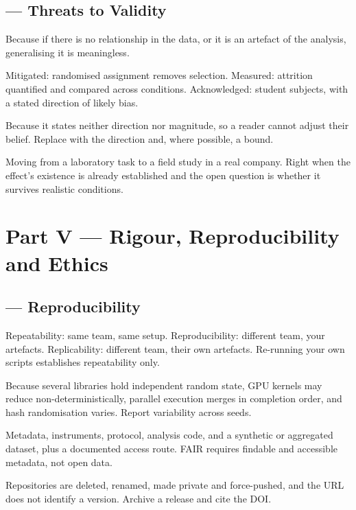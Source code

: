 \subsection*{ --- Threats to Validity}
\begin{tightnum}
  \item Because if there is no relationship in the data, or it is an artefact
    of the analysis, generalising it is meaningless.
  \item Mitigated: randomised assignment removes selection. Measured: attrition
    quantified and compared across conditions. Acknowledged: student subjects,
    with a stated direction of likely bias.
  \item Because it states neither direction nor magnitude, so a reader cannot
    adjust their belief. Replace with the direction and, where possible, a
    bound.
  \item Moving from a laboratory task to a field study in a real company. Right
    when the effect's existence is already established and the open question is
    whether it survives realistic conditions.
\end{tightnum}

\section{Part V --- Rigour, Reproducibility and Ethics}

\subsection*{ --- Reproducibility}
\begin{tightnum}
  \item Repeatability: same team, same setup. Reproducibility: different team,
    your artefacts. Replicability: different team, their own artefacts.
    Re-running your own scripts establishes repeatability only.
  \item Because several libraries hold independent random state, GPU kernels
    may reduce non-deterministically, parallel execution merges in completion
    order, and hash randomisation varies. Report variability across seeds.
  \item Metadata, instruments, protocol, analysis code, and a synthetic or
    aggregated dataset, plus a documented access route. FAIR requires findable
    and accessible metadata, not open data.
  \item Repositories are deleted, renamed, made private and force-pushed, and
    the URL does not identify a version. Archive a release and cite the DOI.
\end{tightnum}

